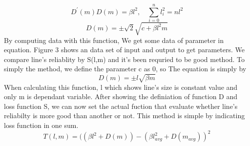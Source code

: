 {\begin{equation}
\mathit{{D}^{\prime}(m)D(m) = \beta{l}^{2},\quad\sum_{i=0}^{n}{{l}_{i}^{2}} = n{l}^{2}}
\end{equation}
\begin{equation}
\mathit{D(m)=\pm\sqrt{2}\sqrt{c+\beta{l}^{2}m}}
\end{equation}
By computing data with this function, We get some data of parameter in equation. Figure 3 shows an data set of input and output to get parameters. We compare line's reliablity by S(l,m) and it's been requried to be good method. To simply the method, we define the parameter c as 0, so The equation is simply by
\begin{equation}
\mathit{D(m)=\pm l\sqrt{\beta m}}
\end{equation}
When calculating this function, l which shows line's size is constant value and only m is dependant variable. After showing the definiation of function D and loss function S, we can now set the actual fuction that evaluate whether line's reliabilty is more good than another or not. This method is simple by indicating loss function in one sum.
\begin{equation}
\mathit{T(l,m) = ((\beta l^{2}+D(m)) - (\beta {l}_{avg}^{2}+D(m_{avg}))^{2}}
\end{equation}
}
